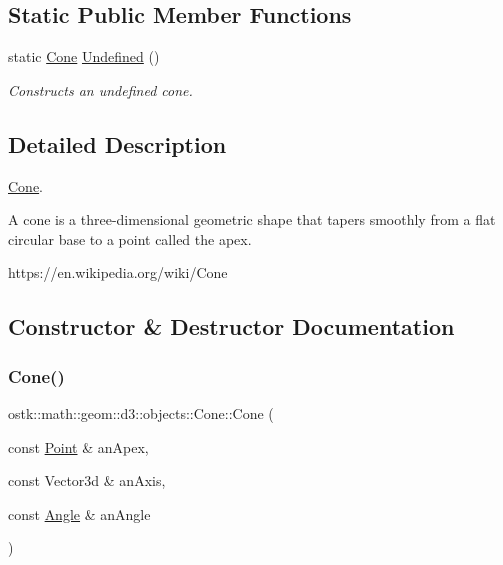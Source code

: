 \subsection*{Static Public Member Functions}
\begin{DoxyCompactItemize}
\item 
static \hyperlink{classostk_1_1math_1_1geom_1_1d3_1_1objects_1_1_cone}{Cone} \hyperlink{classostk_1_1math_1_1geom_1_1d3_1_1objects_1_1_cone_a06438bb2e619615fcbbce8097186edbe}{Undefined} ()
\begin{DoxyCompactList}\small\item\em Constructs an undefined cone. \end{DoxyCompactList}\end{DoxyCompactItemize}


\subsection{Detailed Description}
\hyperlink{classostk_1_1math_1_1geom_1_1d3_1_1objects_1_1_cone}{Cone}. 

A cone is a three-\/dimensional geometric shape that tapers smoothly from a flat circular base to a point called the apex.

https\+://en.wikipedia.\+org/wiki/\+Cone 

\subsection{Constructor \& Destructor Documentation}
\mbox{\label{classostk_1_1math_1_1geom_1_1d3_1_1objects_1_1_cone_ac86773a78cf513900e8b0d3a2709bfcb}} 
\subsubsection{\texorpdfstring{Cone()}{Cone()}}
{\footnotesize\ttfamily ostk\+::math\+::geom\+::d3\+::objects\+::\+Cone\+::\+Cone (\begin{DoxyParamCaption}\item[{const \hyperlink{classostk_1_1math_1_1geom_1_1d3_1_1objects_1_1_point}{Point} \&}]{an\+Apex,  }\item[{const Vector3d \&}]{an\+Axis,  }\item[{const \hyperlink{classostk_1_1math_1_1geom_1_1_angle}{Angle} \&}]{an\+Angle }\end{DoxyParamCaption})}



